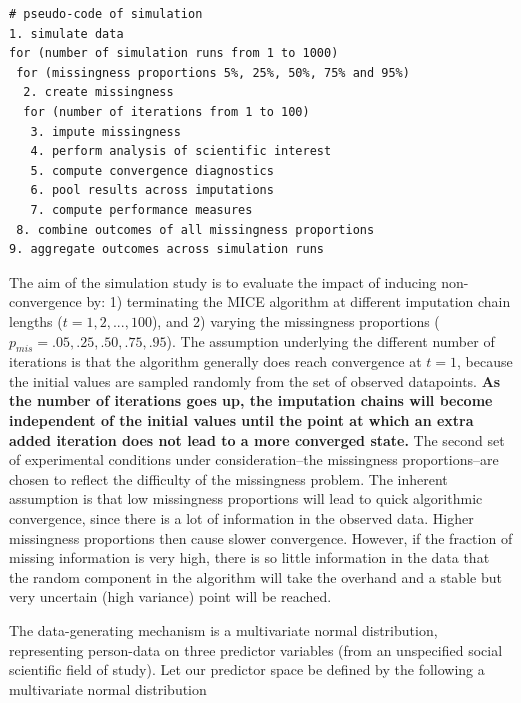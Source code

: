 \documentclass[Royal,times,sageh]{sagej}
\begin{document}
\begin{verbatim}
# pseudo-code of simulation 
1. simulate data 
for (number of simulation runs from 1 to 1000)
 for (missingness proportions 5%, 25%, 50%, 75% and 95%)
  2. create missingness
  for (number of iterations from 1 to 100)
   3. impute missingness
   4. perform analysis of scientific interest
   5. compute convergence diagnostics 
   6. pool results across imputations
   7. compute performance measures
 8. combine outcomes of all missingness proportions
9. aggregate outcomes across simulation runs 
\end{verbatim}

The aim of the simulation study is to evaluate the impact of inducing
non-convergence by: 1) terminating the MICE algorithm at different
imputation chain lengths (\(t = 1, 2,..., 100\)), and 2) varying the
missingness proportions (\(p_{mis} =.05,.25,.50,.75,.95\)). The
assumption underlying the different number of iterations is that the
algorithm generally does reach convergence at \(t=1\), because the
initial values are sampled randomly from the set of observed datapoints.
\textbf{As the number of iterations goes up, the imputation chains will
become independent of the initial values until the point at which an
extra added iteration does not lead to a more converged state.} The
second set of experimental conditions under consideration--the
missingness proportions--are chosen to reflect the difficulty of the
missingness problem. The inherent assumption is that low missingness
proportions will lead to quick algorithmic convergence, since there is a
lot of information in the observed data. Higher missingness proportions
then cause slower convergence. However, if the fraction of missing
information is very high, there is so little information in the data
that the random component in the algorithm will take the overhand and a
stable but very uncertain (high variance) point will be reached.

The data-generating mechanism is a multivariate normal distribution,
representing person-data on three predictor variables (from an
unspecified social scientific field of study). Let our predictor space
be defined by the following a multivariate normal distribution
\end{document}
